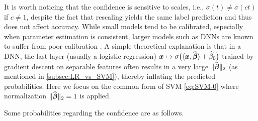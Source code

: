 It is worth noticing that the confidence is sensitive to scales, i.e., $\sigma(t) \not= \sigma(ct)$ if $c \not= 1$, despite the fact that rescaling yields the same label prediction and thus does not affect accuracy. While small models tend to be calibrated, especially when parameter estimation is consistent, larger models such as DNNs are known to suffer from poor calibration \cite{guo2017calibration}. A simple theoretical explanation is that in a DNN, the last layer (usually a logistic regression) $\text{\boldmath $x$} \mapsto \sigma\bigl( \langle \text{\boldmath $x$}, \widehat{\text{\boldmath $\beta$}} \rangle + \widehat\beta_0 \bigr)$ trained by gradient descent on separable features often results in a very large $\| \widehat{{\boldsymbol{\beta}}}\|_2$ (as mentioned in \cref{subsec:LR_vs_SVM}), thereby inflating the predicted probabilities. Here we focus on the common form of SVM \eqref{eq:SVM-0} where normalization $\| \widehat{{\boldsymbol{\beta}}} \|_2 = 1$ is applied.

Some probabilities regarding the confidence are as follows.


